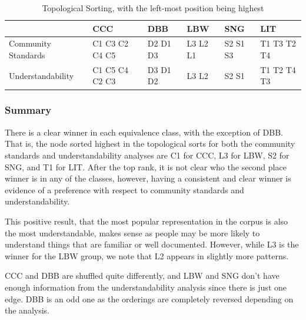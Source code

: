 \begin{table}
\centering
\caption{Topological Sorting, with the left-most position being highest \label{topologicalResults}}
\begin{tabular}{|| l || l || l || l || l || l ||}
				& CCC			& DBB 		& LBW & SNG & LIT \\ \hline
Community Standards		& C1 C3 C2 C4 C5 	& D2 D1 D3	&  L3 L2 L1 	& S2 S1 S3 	& T1 T3 T2 T4 \\
Understandability 			& C1 C5 C4 C2 C3 	& D3 D1 D2 	& L3 L2		& S2 S1		& T1 T2 T4 T3 \\
\end{tabular}
\end{table}

\subsubsection{Summary}
There is a clear winner in each equivalence class, with the exception of DBB.
That is, the node sorted highest in the topological sorts for both the community standards and understandability analyses are C1 for CCC, L3 for LBW, S2 for SNG, and T1 for LIT.
After the top rank, it is not clear who the second place winner is in any of the classes, however, having a consistent and clear winner is evidence of a preference with respect to community standards and understandability.

This positive result, that the most popular representation in the corpus is also the most understandable, makes sense as people may be more likely to understand things that are familiar or well documented. However, while L3 is the winner for the LBW group, we note that L2 appears in slightly more patterns.

CCC and DBB are shuffled quite differently, and LBW and SNG don't have enough information from the understandability analysis since there is just one edge. DBB is an odd one as the orderings are completely reversed depending on the analysis.










